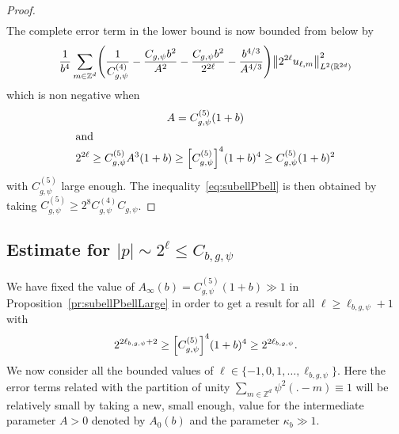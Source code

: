 \documentclass[AHL,Unicode,longabstracts]{cedram}
\newcommand{\Z}{\mathbb{Z}}
\newcommand{\R}{\mathbb{R}}
\let\originalleft\left
\let\originalright\right
\renewcommand{\left}{\mathopen{}\mathclose\bgroup\originalleft}
\renewcommand{\right}{\aftergroup\egroup\originalright}
\begin{document}
\begin{proof}
\begin{multline*}
\end{multline*}
The complete error term in the lower bound is now bounded from below by
\[
\frac{1}{b^{4}}\sum_{m\in\Z^{d}}\left(\frac{1}{C^{(4)}_{g,\psi}}-\frac{C_{g,\psi}b^{2}}{A^{2}}-\frac{C_{g,\psi}b^{2}}{2^{2\ell}}-\frac{b^{4/3}}{A^{4/3}}\right)
\left\|2^{2\ell}u_{\ell,m}\right\|_{L^{2}(\R^{2d})}^{2}
\]
which is non negative when
\begin{gather*}
A=C_{g,\psi}^{(5)}(1+b) \\
\intertext{and}
2^{2\ell}\geq C_{g,\psi}^{(5)} A^3(1+b) \geq\left[C_{g,\psi}^{(5)}\right]^{4}(1+b)^{4}\geq C_{g,\psi}^{(5)}(1+b)^2
\end{gather*}
with $C^{(5)}_{g,\psi}$ large enough. The inequality~\eqref{eq:subellPbell} is then obtained by taking $C_{g,\psi}^{(5)}\geq 2^{8}C_{g,\psi}^{(4)}C_{g,\psi}$.
\end{proof}

\subsection{Estimate for \texorpdfstring{$|p|\sim 2^{\ell}\leq C_{b,g,\psi}$}{|p| sim 2\^l=< C\_b,g, psi}}

We have fixed the value of $A_\infty(b)=C_{g,\psi}^{(5)}(1+b)\gg 1$ in Proposition~\ref{pr:subellPbellLarge} in order to get a result for all $\ell\geq \ell_{b,g,\psi}+1$ with
\begin{equation}\label{eq:defellb}
2^{2\ell_{b,g,\psi}+2}\geq \left[C_{g,\psi}^{(5)}\right]^{4}(1+b)^{4}\geq 2^{2\ell_{b,g,\psi}}.
\end{equation}
We now consider all the bounded values of $\ell\in \{-1,0,1,\dots,\ell_{b,g,\psi}\}$. Here the error terms related with the partition of unity $\sum_{m\in \Z^{d}}\psi^{2}(.-m)\equiv 1$ will be relatively small by taking a new, small enough, value for the intermediate parameter $A>0$ denoted by $A_0(b)$ and the parameter $\kappa_{b}\gg 1$.
\end{document}
